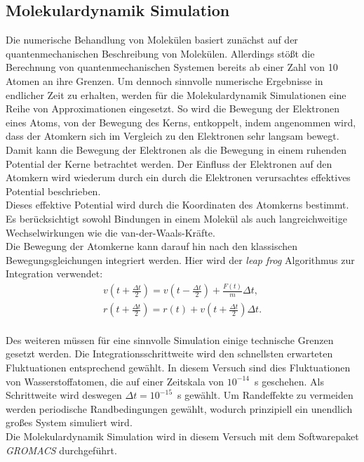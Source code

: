 \subsection{Molekulardynamik Simulation}
Die numerische Behandlung von Molekülen basiert zunächst auf der quantenmechanischen Beschreibung von Molekülen.
Allerdings stößt die Berechnung von quantenmechanischen Systemen bereits ab einer Zahl von 10 Atomen an ihre Grenzen.
Um dennoch sinnvolle numerische Ergebnisse in endlicher Zeit zu erhalten, werden für die Molekulardynamik Simulationen eine Reihe von Approximationen eingesetzt.
So wird die Bewegung der Elektronen eines Atoms, von der Bewegung des Kerns, entkoppelt, indem angenommen wird, dass der Atomkern sich im Vergleich zu den Elektronen sehr langsam bewegt.
Damit kann die Bewegung der Elektronen als die Bewegung in einem ruhenden Potential der Kerne betrachtet werden.
Der Einfluss der Elektronen auf den Atomkern wird wiederum durch ein durch die Elektronen verursachtes effektives Potential beschrieben.
\\ \noindent
Dieses effektive Potential wird durch die Koordinaten des Atomkerns bestimmt. Es berücksichtigt sowohl Bindungen in einem Molekül als auch langreichweitige Wechselwirkungen wie die van-der-Waals-Kräfte.
\\ \noindent
Die Bewegung der Atomkerne kann darauf hin nach den klassischen Bewegungsgleichungen integriert werden.
Hier wird der \emph{leap frog} Algorithmus zur Integration verwendet:
\begin{align}
v\left(t+\frac{\Delta t}{2}\right) = v\left(t-\frac{\Delta t}{2}\right) + \frac{F(t)}{m}\Delta t, \\
r\left(t+\frac{\Delta t}{2}\right) = r(t) + v\left(t+\frac{\Delta t}{2}\right)\Delta t.
\end{align}
\\ \noindent
Des weiteren müssen für eine sinnvolle Simulation einige technische Grenzen gesetzt werden.
Die Integrationsschrittweite wird den schnellsten erwarteten Fluktuationen entsprechend gewählt. In diesem Versuch sind dies Fluktuationen von Wasserstoffatomen, die auf einer Zeitskala von $10^{-14}$~s geschehen. Als Schrittweite wird deswegen $\Delta t = 10^{-15}$~s gewählt.
Um Randeffekte zu vermeiden werden periodische Randbedingungen gewählt, wodurch prinzipiell ein unendlich großes System simuliert wird.
\\ \noindent
Die Molekulardynamik Simulation wird in diesem Versuch mit dem Softwarepaket \emph{GROMACS} durchgeführt.

